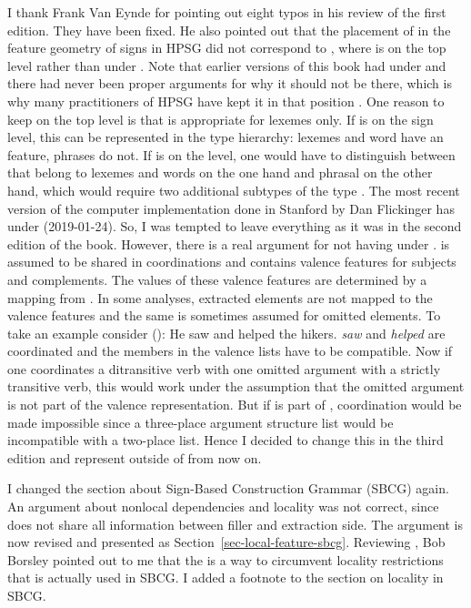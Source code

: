 I thank Frank Van Eynde for pointing out eight typos in his review of the first edition. They have
been fixed. He also pointed out that the placement of \argst in the feature geometry of signs in
HPSG did not correspond to , where \argst is on the top level rather than under
\cat. Note that earlier versions of this book had \argst under \cat and there had never been proper
arguments for why it should not be there, which is why many practitioners of HPSG have kept it in
that position \citep{MuellerLFGphrasal}. One reason to keep \argst on the top level is that \argst is appropriate
for lexemes only. If \argst is on the sign level, this can be represented in the type hierarchy:
lexemes and word have an \argst feature, phrases do not. If \argst is on the \cat level, one would
have to distinguish between \catvs that belong to lexemes and words on the one hand and phrasal
\catvs on the other hand, which would require two additional subtypes of the type . 
The most recent version of the computer implementation done in Stanford by Dan Flickinger has \argst
under \local (2019-01-24). So, I was tempted to leave everything as it was in the second edition of
the book. However, there is a real argument for not having \argst under \cat. \cat is assumed to be
shared in coordinations and \cat contains valence features for subjects and complements. The values of
these valence features are determined by a mapping from \argst. In some analyses, extracted elements
are not mapped to the valence features and the same is sometimes assumed for omitted elements. To
take an example consider ():
\ea
He saw and helped the hikers.
\z
\emph{saw} and \emph{helped} are coordinated and the members in the valence lists have to be
compatible. Now if one coordinates a ditransitive verb with one omitted argument with a strictly
transitive verb, this would work under the assumption that the omitted argument is not part of the
valence representation. But if \argst is part of \cat, coordination would be made impossible since a
three-place argument structure list would be incompatible with a two-place list. Hence I decided to
change this in the third edition and represent \argst outside of \cat from now on.

I changed the section about Sign-Based Construction Grammar (SBCG) again. An argument about nonlocal
dependencies and locality was not correct, since \citet[]{Sag2012a} does not share all
information between filler and extraction side. The argument is now revised and presented as
Section~\ref{sec-local-feature-sbcg}. Reviewing , Bob Borsley pointed out to me that the \xargf is a way to
circumvent locality restrictions that is actually used in SBCG. I added a footnote to the section on
locality in SBCG.

